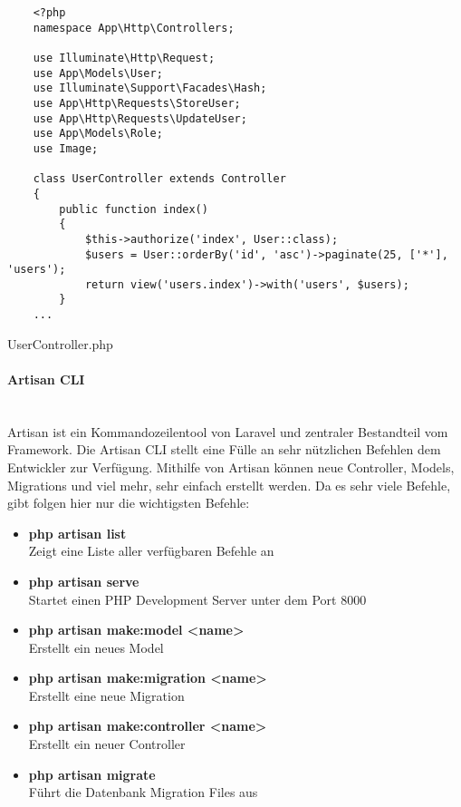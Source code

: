 \begin{listing}[H]
  \begin{verbatim}
    <?php
    namespace App\Http\Controllers;

    use Illuminate\Http\Request;
    use App\Models\User;
    use Illuminate\Support\Facades\Hash;
    use App\Http\Requests\StoreUser;
    use App\Http\Requests\UpdateUser;
    use App\Models\Role;
    use Image;

    class UserController extends Controller
    {
        public function index()
        {
            $this->authorize('index', User::class);
            $users = User::orderBy('id', 'asc')->paginate(25, ['*'], 'users');
            return view('users.index')->with('users', $users);
        }
    ...
  \end{verbatim}
  \caption{UserController.php}
\end{listing}

\paragraph{Artisan CLI}\mbox{}\\
Artisan ist ein Kommandozeilentool von Laravel und zentraler Bestandteil vom Framework. Die
Artisan CLI
stellt eine Fülle an sehr nützlichen Befehlen dem Entwickler zur Verfügung.
Mithilfe von Artisan können neue Controller, Models, Migrations und viel mehr, sehr
einfach erstellt werden. Da es sehr viele Befehle, gibt folgen hier nur die
wichtigsten Befehle:

\begin{itemize}
  \item \textbf{php artisan list}\\
  Zeigt eine Liste aller verfügbaren Befehle an
  \item \textbf{php artisan serve}\\
  Startet einen PHP Development Server unter dem Port 8000
  \item \textbf{php artisan make:model <name>}\\
  Erstellt ein neues Model
  \item \textbf{php artisan make:migration <name>}\\
  Erstellt eine neue Migration
  \item \textbf{php artisan make:controller <name>}\\
  Erstellt ein neuer Controller
  \item \textbf{php artisan migrate}\\
  Führt die Datenbank Migration Files aus
\end{itemize}

